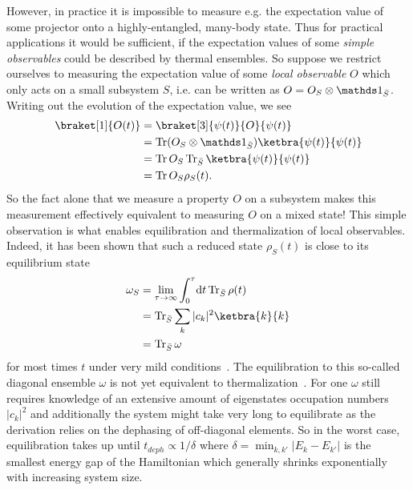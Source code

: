 However, in practice it is impossible to measure e.g. the expectation value of some projector onto a highly-entangled, many-body state. Thus for practical applications it would be sufficient, if the expectation values of some \emph{simple observables} could be described by thermal ensembles. So suppose
we restrict ourselves to measuring the expectation value of some \emph{local observable} $O$ which only acts on a small subsystem $S$, i.e. can be written as $O=O_S\otimes \bbone_{\bar{S}}$. Writing out the evolution of the expectation value, we see
\begin{align}
	\braket[1]{O(t)} &= \braket[3]{\psi(t)}{O}{\psi(t)} \\
	& = \Tr (O_S\otimes\bbone_{\bar{S}})\ketbra{\psi(t)}{\psi(t)}\\
	& = \Tr O_S \Tr_{\bar S} \ketbra{\psi(t)}{\psi(t)}\\
	&= \Tr O_S \rho_S(t).
\end{align}
So the fact alone that we measure a property $O$ on a subsystem makes this measurement effectively equivalent to measuring $O$ on a mixed state! This simple observation is what enables equilibration and thermalization of local observables. Indeed, it has been shown that such a reduced state $\rho_S(t)$ is close to its equilibrium state
\begin{align}
	\omega_S &= \lim_{\tau\rightarrow\infty}\int_{0}^{\tau}\!\mathrm{d}t \Tr_{\bar S}\rho(t)\\
	&= \Tr_{\bar S} \sum_k |c_k|^2 \ketbra{k}{k}\\
	&= \Tr_{\bar S} \omega
\end{align}\label{eq:diagonal-ensemble}
for most times $t$ under very mild conditions~\cite{reimannFoundationStatisticalMechanics2008,lindenQuantumMechanicalEvolution2009}. 
The equilibration to this so-called diagonal ensemble $\omega$ is not yet equivalent to thermalization~\cite{dziarmagaDynamicsQuantumPhase2010,polkovnikovColloquiumNonequilibriumDynamics2011}. For one $\omega$ still requires knowledge of an extensive amount of eigenstates occupation numbers  $|c_k|^2$ and additionally the system might take very long to equilibrate as the derivation relies on the dephasing of off-diagonal elements. So in the worst case, equilibration takes up until $t_{deph} \propto 1/\delta$ where $\delta=\min_{k,k'}|E_k-E_{k'}|$ is the smallest energy gap of the Hamiltonian which generally shrinks exponentially with increasing system size. 

